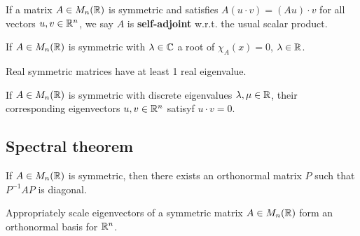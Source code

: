 \begin{definition}
    If a matrix $A\in M_n(\mathbb{R})$ is symmetric and satisfies $A(u\cdot v) = (Au)\cdot v$ for all vectors $u,v\in\mathbb{R}^n$, we say $A$ is \textbf{self-adjoint} w.r.t. the usual scalar product.
\end{definition}

\begin{theorem}
    If $A\in M_n(\mathbb{R})$ is symmetric with $\lambda\in\mathbb{C}$ a root of $\chi_A(x)=0$, $\lambda\in\mathbb{R}$.
\end{theorem}

\begin{corollary}
    Real symmetric matrices have at least 1 real eigenvalue.
\end{corollary}

\begin{theorem}
    If $A\in M_n(\mathbb{R})$ is symmetric with discrete eigenvalues $\lambda,\mu\in\mathbb{R}$, their corresponding eigenvectors $u,v\in\mathbb{R}^n$ satisyf $u\cdot v=0$.
\end{theorem}

\subsection{Spectral theorem}
    
\begin{theorem}
    If $A\in M_n(\mathbb{R})$ is symmetric, then there exists an orthonormal matrix $P$ such that $P^{-1}AP$ is diagonal.
\end{theorem}

\begin{corollary}
    Appropriately scale eigenvectors of a symmetric matrix $A\in M_n(\mathbb{R})$ form an orthonormal basis for $\mathbb{R}^n$.
\end{corollary}

